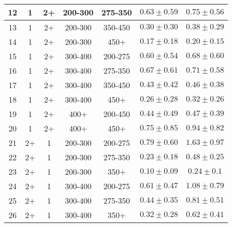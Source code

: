 \begin{table}[htbp]
{\begin{tabular}{|c|c|c|c|c||c|c|}
 \hline
             12 &               1 &              2+ &         200-300 &         275-350 & $0.63 \pm 0.59$ & $ 0.75 \pm 0.56 $\\
 \hline
             13 &               1 &              2+ &         200-300 &         350-450 & $0.30 \pm 0.30$ & $ 0.38 \pm 0.29 $\\
 \hline
             14 &               1 &              2+ &         200-300 &            450+ & $0.17 \pm 0.18$ & $ 0.20 \pm 0.15 $\\
 \hline
             15 &               1 &              2+ &         300-400 &         200-275 & $0.60 \pm 0.54$ & $ 0.68 \pm 0.60 $\\
 \hline
             16 &               1 &              2+ &         300-400 &         275-350 & $0.67 \pm 0.61$ & $ 0.71 \pm 0.58 $\\
 \hline
             17 &               1 &              2+ &         300-400 &         350-450 & $0.43 \pm 0.42$ & $ 0.46 \pm 0.38 $\\
 \hline
             18 &               1 &              2+ &         300-400 &            450+ & $0.26 \pm 0.28$ & $ 0.32 \pm 0.26 $\\
 \hline
             19 &               1 &              2+ &            400+ &         200-450 & $0.44 \pm 0.49$ & $ 0.47 \pm 0.39 $\\
 \hline
             20 &               1 &              2+ &            400+ &            450+ & $0.75 \pm 0.85$ & $ 0.94 \pm 0.82 $\\
 \hline
             21 &              2+ &               1 &         200-300 &         200-275 & $0.79 \pm 0.60$ & $ 1.63 \pm 0.97 $\\
 \hline
             22 &              2+ &               1 &         200-300 &         275-350 & $0.23 \pm 0.18$ & $ 0.48 \pm 0.25 $\\
 \hline
             23 &              2+ &               1 &         200-300 &            350+ & $0.10 \pm 0.09$ & $ 0.24 \pm 0.1 $\\
 \hline
             24 &              2+ &               1 &         300-400 &         200-275 & $0.61 \pm 0.47$ & $ 1.08 \pm 0.79 $\\
 \hline
             25 &              2+ &               1 &         300-400 &         275-350 & $0.44 \pm 0.35$ & $ 0.81 \pm 0.51 $\\
 \hline
             26 &              2+ &               1 &         300-400 &            350+ & $0.32 \pm 0.28$ & $ 0.62 \pm 0.41 $\\

\end{tabular}}
\end{table}
